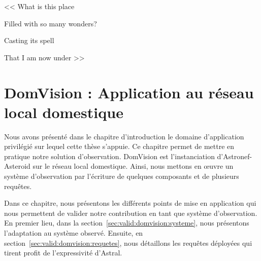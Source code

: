 \begin{savequote}[6cm]
<< What is this place

Filled with so many wonders?

Casting its spell

That I am now under >>

\end{savequote}

\chapter{DomVision : Application au réseau local domestique}\label{chap:valid:domvision}
\chaptertoc
Nous avons présenté dans le chapitre d'introduction le domaine d'application privilégié sur lequel cette thèse s'appuie. Ce chapitre permet de mettre en pratique notre solution d'observation. DomVision est l'instanciation d'Astronef-Asteroid sur le réseau local domestique. Ainsi, nous mettons en œuvre un système d'observation par l'écriture de quelques composants et de plusieurs requêtes.

Dans ce chapitre, nous présentons les différents points de mise en application qui nous permettent de valider notre contribution en tant que système d'observation. En premier lieu, dans la section~\ref{sec:valid:domvision:systeme}, nous présentons l'adaptation au système observé. Ensuite, en section~\ref{sec:valid:domvision:requetes}, nous détaillons les requêtes déployées qui tirent profit de l'expressivité d'Astral. 




